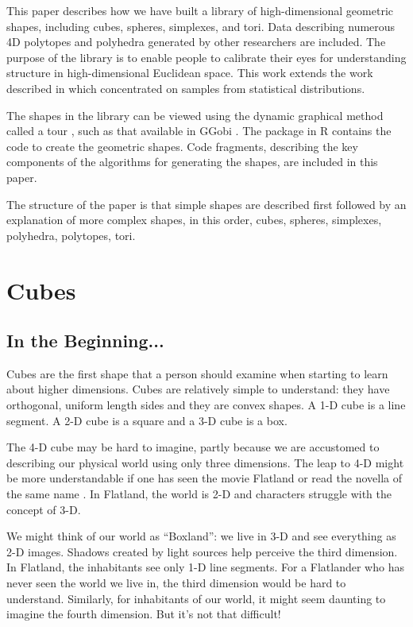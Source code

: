 This paper describes how we have built a library of high-dimensional
geometric shapes, including cubes, spheres, simplexes, and tori. Data
describing numerous 4D polytopes and polyhedra generated by other
researchers are included. The purpose of the library is to enable
people to calibrate their eyes for understanding structure in
high-dimensional Euclidean space. This work extends the work described
in \cite{Co97} which concentrated on samples from statistical
distributions.

The shapes in the library can be viewed using the dynamic graphical
method called a tour \citep{AS85}, such as that available in GGobi
\citep{STLBC02}.  The  package in R \citep{R03} contains
the code to create the geometric shapes. Code fragments, describing
the key components of the algorithms for generating the shapes, are
included in this paper.

The structure of the paper is that simple shapes are described first
followed by an explanation of more complex shapes, in this order,
cubes, spheres, simplexes, polyhedra, polytopes, tori.







\section{Cubes}

\subsection{In the Beginning...}

Cubes are the first shape that a person should examine when
starting to learn about higher dimensions. Cubes are relatively simple
to understand: they have orthogonal, uniform length sides and they are
convex shapes. A 1-D cube is a line segment. A 2-D cube is a square and
a 3-D cube is a box.

The 4-D cube may be hard to imagine, partly because we are accustomed
to describing our physical world using only three dimensions.  The
leap to 4-D might be more understandable if one has seen the movie
Flatland \citep{Ma65} or read the novella of the same name
\citep{Ab1884}. In Flatland, the world is 2-D and characters struggle
with the concept of 3-D.

We might think of our world as ``Boxland'': we live in 3-D and see
everything as 2-D images. Shadows created by light sources help
perceive the third dimension. In Flatland, the inhabitants see only
1-D line segments. For a Flatlander who has never seen the world we
live in, the third dimension would be hard to understand. Similarly,
for inhabitants of our world, it might seem daunting to imagine the
fourth dimension. But it's not that difficult!

